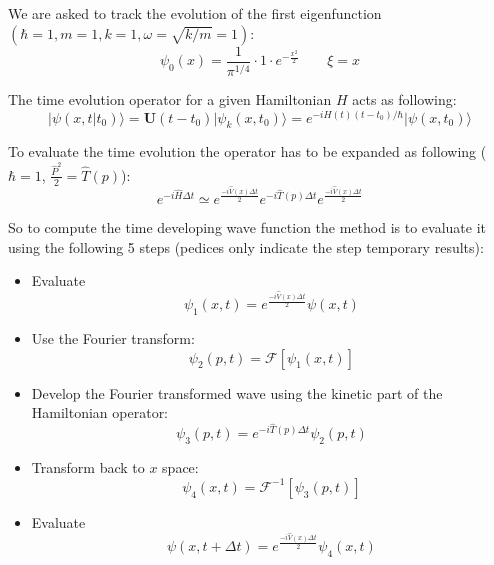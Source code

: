 \documentclass[12pt, a4paper, notitlepage]{report}
\begin{document}
We are asked to track the evolution of the first eigenfunction $ ( \hbar = 1, m=1, k=1, \omega = \sqrt{k/m} = 1 ) $:
\begin{equation}
\psi_0 (x) = \frac{1}{\pi^{1/4}} \cdot 1 \cdot e^{-\frac{x^2}{2}} \qquad \xi = x
\end{equation}

The time evolution operator for a given Hamiltonian $H$ acts as following:
\begin{equation}
\vert \psi (x,t\vert t_0) \rangle = \mathbf{U}(t-t_0) \vert \psi_k (x,t_0) \rangle = e^{ -i H(t) (t-t_0)/\hbar } \vert \psi (x, t_0) \rangle
\end{equation}

To evaluate the time evolution the operator has to be expanded as following ($\hbar = 1$, $\frac{\hat{P}^2}{2} = \hat{T}(p)$):
\begin{equation}
e^{ -i \hat{H} \Delta t } \simeq e^{ \frac{-i \hat{V}(x) \Delta t}{2} }  e^{ -i \hat{T}(p) \Delta t } e^{ \frac{-i \hat{V}(x) \Delta t}{2}}
\end{equation}

So to compute the time developing wave function the method is to evaluate it using the following 5 steps (pedices only indicate the step temporary results):
\begin{itemize}
	\item Evaluate
	\begin{equation}
		\psi_1 (x,t) = e^{ \frac{-i \hat{V}(x) \Delta t}{2}} \psi (x,t)
	\end{equation}
	\item Use the Fourier transform:
	\begin{equation}
		\psi_2 (p,t) = \mathcal{F} [\psi_1 (x,t) ]
	\end{equation}
	\item Develop the Fourier transformed wave using the kinetic part of the Hamiltonian operator:
	\begin{equation}
		\psi_3 (p,t) = e^{ -i \hat{T}(p) \Delta t } \psi_2 (p,t)
	\end{equation}
	\item Transform back to $x$ space:
	\begin{equation}
	\psi_4 (x,t) = \mathcal{F}^{-1} [\psi_3 (p,t)]
	\end{equation}
	\item Evaluate
	\begin{equation}
	\psi (x, t + \Delta t) = e^{ \frac{-i \hat{V}(x) \Delta t}{2}} \psi_4 (x,t)
	\end{equation}
\end{itemize}
\end{document}
